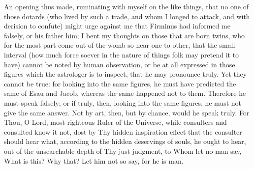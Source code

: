 \documentclass[b5paper,openright,12pt,twoside]{book}
\begin{document}
An opening thus made, ruminating with myself on the like things, that
no one of those dotards (who lived by such a trade, and whom I longed
to attack, and with derision to confute) might urge against me that
Firminus had informed me falsely, or his father him; I bent my thoughts
on those that are born twins, who for the most part come out of the womb
so near one to other, that the small interval (how much force soever
in the nature of things folk may pretend it to have) cannot be noted
by human observation, or be at all expressed in those figures which the
astrologer is to inspect, that he may pronounce truly. Yet they cannot
be true: for looking into the same figures, he must have predicted the
same of Esau and Jacob, whereas the same happened not to them. Therefore
he must speak falsely; or if truly, then, looking into the same figures,
he must not give the same answer. Not by art, then, but by chance, would
he speak truly. For Thou, O Lord, most righteous Ruler of the Universe,
while consulters and consulted know it not, dost by Thy hidden
inspiration effect that the consulter should hear what, according to the
hidden deservings of souls, he ought to hear, out of the unsearchable
depth of Thy just judgment, to Whom let no man say, What is this? Why
that? Let him not so say, for he is man.
\end{document}
